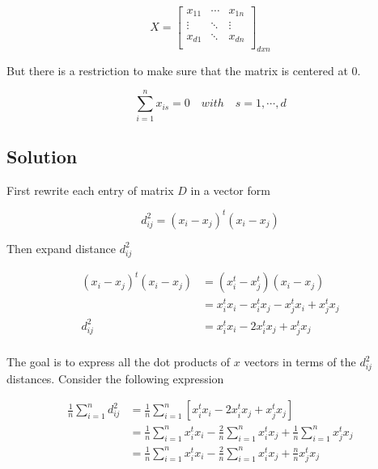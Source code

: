 \documentclass[12pt,journal]{IEEEtran}
\begin{document}
    \[
        X =
        \begin{bmatrix}
            x_{11} & \cdots & x_{1n}\\
            \vdots & \ddots & \vdots\\
            x_{d1} & \ddots & x_{dn}\\
        \end{bmatrix}_{d x n}
    \]

    But there is a restriction to make sure that the matrix is centered at 0.

    \begin{equation*} 
        \sum_{i=1}^n x_{is} = 0 \quad with \quad s = 1, \cdots, d
    \end{equation*} 

    \subsection{Solution}

    First rewrite each entry of matrix $D$ in a vector form

    \begin{equation*}
        d_{ij}^2 = (x_i-x_j)^t (x_i-x_j)
    \end{equation*}

    Then expand distance $d_{ij}^2$

    \begin{equation*}
        \begin{aligned}
            (x_i-x_j)^t (x_i-x_j) &= (x_i^t-x_j^t) (x_i-x_j)\\
                                  &= x_i^t x_i - x_i^t x_j - x_j^t x_i + x_j^t x_j\\
                         d_{ij}^2 &= x_i^t x_i - 2 x_i^t x_j + x_j^t x_j\\
        \end{aligned}
    \end{equation*}

    The goal is to express all the dot products of $x$ vectors in terms of the
    $d_{ij}^2$ distances. Consider the following expression

    \begin{equation*}
        \begin{aligned}
            \frac{1}{n} \sum_{i=1}^n d_{ij}^2 &= \frac{1}{n} \sum_{i=1}^n [x_i^t x_i - 2 x_i^t x_j + x_j^t x_j]\\
            &=  \frac{1}{n} \sum_{i=1}^n x_i^t x_i - \frac{2}{n} \sum_{i=1}^n x_i^t x_j + \frac{1}{n} \sum_{i=1}^n x_j^t x_j\\
            &=  \frac{1}{n} \sum_{i=1}^n x_i^t x_i - \frac{2}{n} \sum_{i=1}^n x_i^t x_j + \frac{n}{n} x_j^t x_j \\
        \end{aligned}
    \end{equation*}
\end{document}
